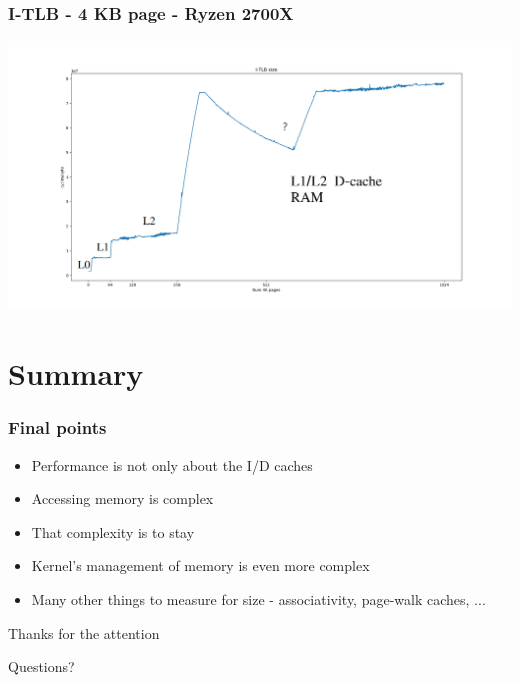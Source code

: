 \documentclass{beamer}
\begin{document}
\begin{frame}
\frametitle{I-TLB - 4 KB page - Ryzen 2700X}
\centerline{\includegraphics[scale=.23]{img/itlb_size_zen.png}}
\end{frame}

\section{Summary}

\begin{frame}
\frametitle{Final points}
\begin{itemize}
\item Performance is not only about the I/D caches
\item Accessing memory is complex
\item That complexity is to stay
\item Kernel's management of memory is even more complex
\item Many other things to measure for size - associativity, page-walk caches, ...
\end{itemize}

\end{frame}

\begin{frame}
\Huge{\centerline{Thanks for the attention}}
\Huge{\centerline{Questions?}}
\end{frame}

\end{document}
